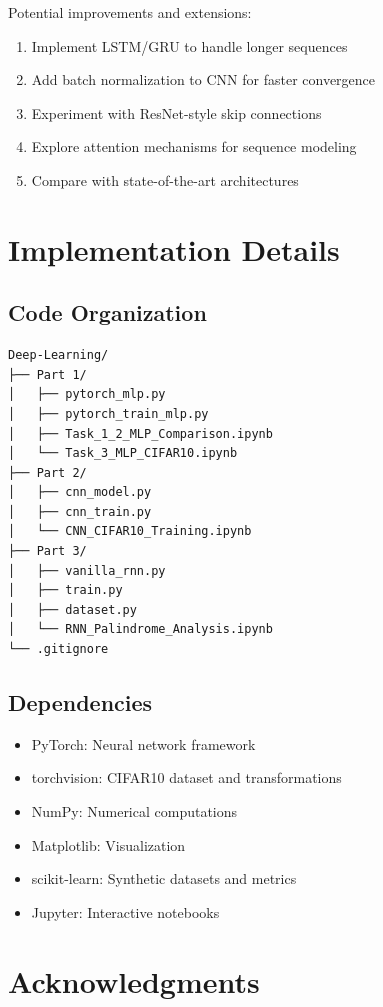 \documentclass[11pt,a4paper]{article}
\begin{document}
Potential improvements and extensions:
\begin{enumerate}
    \item Implement LSTM/GRU to handle longer sequences
    \item Add batch normalization to CNN for faster convergence
    \item Experiment with ResNet-style skip connections
    \item Explore attention mechanisms for sequence modeling
    \item Compare with state-of-the-art architectures
\end{enumerate}

\section{Implementation Details}

\subsection{Code Organization}

\begin{verbatim}
Deep-Learning/
├── Part 1/
│   ├── pytorch_mlp.py
│   ├── pytorch_train_mlp.py
│   ├── Task_1_2_MLP_Comparison.ipynb
│   └── Task_3_MLP_CIFAR10.ipynb
├── Part 2/
│   ├── cnn_model.py
│   ├── cnn_train.py
│   └── CNN_CIFAR10_Training.ipynb
├── Part 3/
│   ├── vanilla_rnn.py
│   ├── train.py
│   ├── dataset.py
│   └── RNN_Palindrome_Analysis.ipynb
└── .gitignore
\end{verbatim}

\subsection{Dependencies}

\begin{itemize}
    \item PyTorch: Neural network framework
    \item torchvision: CIFAR10 dataset and transformations
    \item NumPy: Numerical computations
    \item Matplotlib: Visualization
    \item scikit-learn: Synthetic datasets and metrics
    \item Jupyter: Interactive notebooks
\end{itemize}

\section{Acknowledgments}
\end{document}
